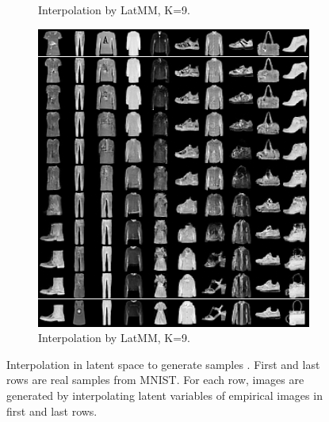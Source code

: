 \begin{figure}[!t]
\begin{subfigure}[b]{0.3\textwidth}
    \caption{Interpolation by LatMM, K=9.}\label{fig-interpo-latmm2}
  \end{subfigure}
  \hspace{10pt}
  \begin{subfigure}[b]{0.3\textwidth}
    \centering
    \includegraphics[width=1\linewidth]{images/fashion-mnist/interpolation/interpoFashion_heter_LatMM_K9_grid.png}
    \caption{Interpolation by LatMM, K=9.}\label{fig-interpo-latmm3}
  \end{subfigure}
  \caption{Interpolation in latent space to generate samples . First
    and last rows are real samples from MNIST. For each row, images
    are generated by interpolating latent variables of empirical
    images in first and last rows.}\label{fig-interpo}
  \label{fig-app-interpolation}
\end{figure}


